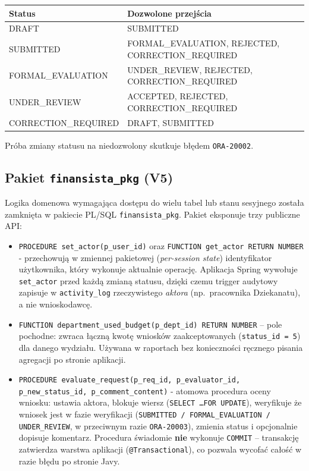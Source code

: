 \documentclass[12pt,a4paper]{article}
\begin{document}
\begin{center}
\begin{tabular}{ll}
  \toprule
  \textbf{Status} & \textbf{Dozwolone przejścia} \\
  \midrule
  DRAFT & SUBMITTED \\
  SUBMITTED & FORMAL\_EVALUATION, REJECTED, CORRECTION\_REQUIRED \\
  FORMAL\_EVALUATION & UNDER\_REVIEW, REJECTED, CORRECTION\_REQUIRED \\
  UNDER\_REVIEW & ACCEPTED, REJECTED, CORRECTION\_REQUIRED \\
  CORRECTION\_REQUIRED & DRAFT, SUBMITTED \\
  \bottomrule
\end{tabular}
\end{center}

Próba zmiany statusu na niedozwolony skutkuje błędem \texttt{ORA-20002}.

\subsection{Pakiet \texttt{finansista\_pkg} (V5)}
Logika domenowa wymagająca dostępu do wielu tabel lub stanu sesyjnego została
zamknięta w pakiecie PL/SQL \texttt{finansista\_pkg}. Pakiet eksponuje trzy
publiczne API:

\begin{itemize}[leftmargin=*]
  \item \texttt{PROCEDURE set\_actor(p\_user\_id)} oraz
        \texttt{FUNCTION get\_actor RETURN NUMBER} - przechowują w zmiennej
        pakietowej (\emph{per-session state}) identyfikator użytkownika,
        który wykonuje aktualnie operację. Aplikacja Spring wywołuje
        \texttt{set\_actor} przed każdą zmianą statusu, dzięki czemu trigger
        audytowy zapisuje w \texttt{activity\_log} rzeczywistego \emph{aktora}
        (np.\ pracownika Dziekanatu), a nie wnioskodawcę.
  \item \texttt{FUNCTION department\_used\_budget(p\_dept\_id) RETURN NUMBER}
        -- pole pochodne: zwraca łączną kwotę wniosków zaakceptowanych
        (\texttt{status\_id = 5}) dla danego wydziału. Używana w raportach
        bez konieczności ręcznego pisania agregacji po stronie aplikacji.
  \item \texttt{PROCEDURE evaluate\_request(p\_req\_id, p\_evaluator\_id,
        p\_new\_status\_id, p\_comment\_content)} - atomowa procedura oceny
        wniosku: ustawia aktora, blokuje wiersz (\texttt{SELECT \ldots FOR UPDATE}),
        weryfikuje że wniosek jest w fazie weryfikacji (\texttt{SUBMITTED /
        FORMAL\_EVALUATION / UNDER\_REVIEW}, w przeciwnym razie
        \texttt{ORA-20003}), zmienia status i opcjonalnie dopisuje komentarz.
        Procedura świadomie \textbf{nie} wykonuje \texttt{COMMIT} --
        transakcję zatwierdza warstwa aplikacji (\texttt{@Transactional}),
        co pozwala wycofać całość w razie błędu po stronie Javy.
\end{itemize}
\end{document}
